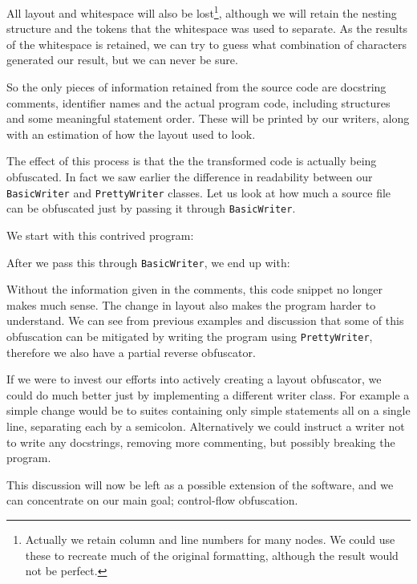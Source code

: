 \documentclass[twoside,a4paper]{report}
\begin{document}
All layout and whitespace will also be lost\footnote{Actually we retain column and line numbers for many nodes. We could
use these to recreate much of the original formatting, although the result would not be perfect.}, although we will retain the nesting structure and the tokens that the
whitespace was used to separate. As the results of the whitespace is retained, we can try to guess what combination
of characters generated our result, but we can never be sure.

So the only pieces of information retained from the source code are docstring comments, identifier names and the actual
program code, including structures and some meaningful statement order. These will be printed by our writers, along with
an estimation of how the layout used to look.

The effect of this process is that the the transformed code is actually being obfuscated. In fact we saw earlier the difference
in readability between our \texttt{BasicWriter} and \texttt{PrettyWriter} classes. Let us look at how much a source file
can be obfuscated just by passing it through \texttt{BasicWriter}.

We start with this contrived program:



After we pass this through \texttt{BasicWriter}, we end up with:



Without the information given in the comments, this code snippet no longer makes much sense. The change in layout also
makes the program harder to understand. We can see from previous examples and discussion that some of this obfuscation
can be mitigated by writing the program using \texttt{PrettyWriter}, therefore we also have a partial reverse obfuscator.

If we were to invest our efforts into actively creating a layout obfuscator, we could do much better just by implementing
a different writer class. For example a simple change would be to suites containing only simple statements all on a single
line, separating each by a semicolon. Alternatively we could instruct a writer not to write any docstrings, removing more
commenting, but possibly breaking the program.

This discussion will now be left as a possible extension of the software, and we can concentrate on our main goal;
control-flow obfuscation.
\end{document}
